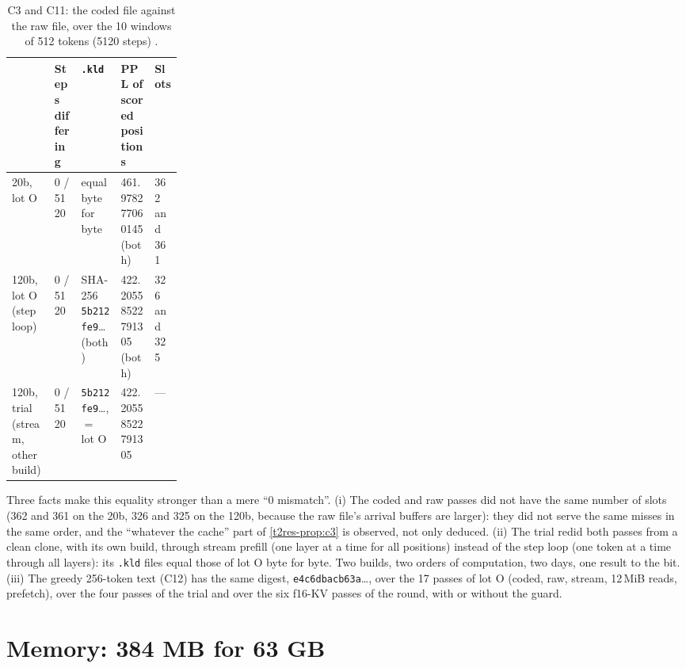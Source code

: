 \begin{table}[ht]
\centering\footnotesize
\caption[C3 and C11: coded against raw]{C3 and C11: the coded file against the raw file, over the 10 windows of 512 tokens (\num{5120} steps) \mes.}
\label{t2res-tab:c3}
\begin{tabularx}{\linewidth}{@{}>{\raggedright\arraybackslash}p{0.25\linewidth}l>{\raggedright\arraybackslash}Xll@{}}
\toprule
& Steps differing & \texttt{.kld} & PPL of scored positions & Slots \\
\midrule
20b, lot O & 0 / \num{5120} & equal byte for byte & \num{461.978277060145} (both) & 362 and 361 \\
120b, lot O (step loop) & 0 / \num{5120} & SHA-256 \texttt{5b212fe9}… (both) & \num{422.20558522791305} (both) & 326 and 325 \\
120b, trial (stream, other build) & 0 / \num{5120} & \texttt{5b212fe9}…, $=$ lot O & \num{422.20558522791305} & --- \\
\bottomrule
\end{tabularx}
\end{table}

Three facts make this equality stronger than a mere ``0 mismatch''. (i) The coded and raw passes did not have the same number of slots (362 and 361 on the 20b, 326 and 325 on the 120b, because the raw file's arrival buffers are larger): they did not serve the same misses in the same order, and the ``whatever the cache'' part of \cref{t2res-prop:c3} is observed, not only deduced. (ii) The trial redid both passes from a clean clone, with its own build, through stream prefill (one layer at a time for all positions) instead of the step loop (one token at a time through all layers): its \texttt{.kld} files equal those of lot O byte for byte. Two builds, two orders of computation, two days, one result to the bit. (iii) The greedy 256-token text (C12) has the same digest, \texttt{e4c6dbacb63a}…, over the 17 passes of lot O (coded, raw, stream, 12\,MiB reads, prefetch), over the four passes of the trial and over the six f16-KV passes of the round, with or without the guard.

\section{Memory: 384 MB for 63 GB}\label{t2res-sec:memoire}

